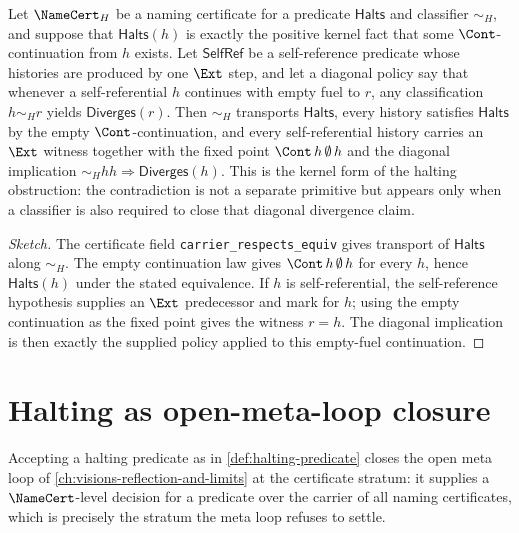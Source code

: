 \begin{theorem}
\label{thm:halting-as-form-of-distinction-fixed-point}
Let $\NameCert_H$ be a naming certificate for a predicate $\mathsf{Halts}$ and classifier $\sim_H$, and suppose that $\mathsf{Halts}(h)$ is exactly the positive kernel fact that some $\Cont$-continuation from $h$ exists. Let $\mathsf{SelfRef}$ be a self-reference predicate whose histories are produced by one $\Ext$ step, and let a diagonal policy say that whenever a self-referential $h$ continues with empty fuel to $r$, any classification $h\sim_H r$ yields $\mathsf{Diverges}(r)$. Then $\sim_H$ transports $\mathsf{Halts}$, every history satisfies $\mathsf{Halts}$ by the empty $\Cont$-continuation, and every self-referential history carries an $\Ext$ witness together with the fixed point $\Cont\,h\,\emptyset\,h$ and the diagonal implication $\sim_H h h \Rightarrow \mathsf{Diverges}(h)$. This is the kernel form of the halting obstruction: the contradiction is not a separate primitive but appears only when a classifier is also required to close that diagonal divergence claim.
\end{theorem}

\begin{proof}[Sketch]
The certificate field \texttt{carrier\_respects\_equiv} gives transport of $\mathsf{Halts}$ along $\sim_H$. The empty continuation law gives $\Cont\,h\,\emptyset\,h$ for every $h$, hence $\mathsf{Halts}(h)$ under the stated equivalence. If $h$ is self-referential, the self-reference hypothesis supplies an $\Ext$ predecessor and mark for $h$; using the empty continuation as the fixed point gives the witness $r=h$. The diagonal implication is then exactly the supplied policy applied to this empty-fuel continuation.
\end{proof}

\section{Halting as open-meta-loop closure}
\label{sec:halting-meta-loop-closure}

\begin{theorem}
\label{thm:halting-meta-loop-closure}
Accepting a halting predicate as in \autoref{def:halting-predicate} closes the open meta loop of \autoref{ch:visions-reflection-and-limits} at the certificate stratum: it supplies a $\NameCert$-level decision for a predicate over the carrier of all naming certificates, which is precisely the stratum the meta loop refuses to settle.
\end{theorem}

